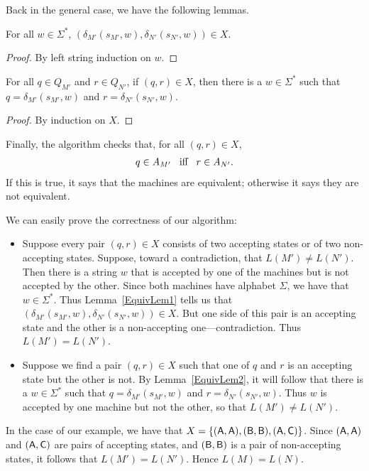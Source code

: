 Back in the general case, we have the following lemmas.

\begin{lemma}
\label{EquivLem1}
For all $w\in\Sigma^*$, $(\delta_{M'}(s_{M'},w),\delta_{N'}(s_{N'},w))\in X$.
\end{lemma}

\begin{proof}
By left string induction on $w$.
\end{proof}

\begin{lemma}
\label{EquivLem2}
For all $q\in Q_{M'}$ and $r\in Q_{N'}$, if $(q,r)\in X$, then there
is a $w\in\Sigma^*$ such that $q=\delta_{M'}(s_{M'},w)$ and
$r=\delta_{N'}(s_{N'},w)$.
\end{lemma}

\begin{proof}
By induction on $X$.
\end{proof}

Finally, the algorithm checks that, for all $(q,r)\in X$,
\begin{gather*}
q\in A_{M'}\mathrel{\;\;\allowbreak\mbox{iff}\allowbreak\;\;} r\in A_{N'} .
\end{gather*}
If this is true, it says that the machines are equivalent; otherwise
it says they are not equivalent.

We can easily prove the correctness of our algorithm:
\begin{itemize}
\item Suppose every pair $(q,r)\in X$ consists of two accepting states
  or of two non-accepting states.  Suppose, toward a contradiction,
  that $L(M')\neq L(N')$.  Then there is a string $w$ that is accepted
  by one of the machines but is not accepted by the other.  Since both
  machines have alphabet $\Sigma$, we have that $w\in\Sigma^*$.  Thus
  Lemma~\ref{EquivLem1} tells us that
  $(\delta_{M'}(s_{M'},w),\delta_{N'}(s_{N'},w))\in X$.  But one side
  of this pair is an accepting state and the other is a non-accepting
  one---contradiction.  Thus $L(M')=L(N')$.

\item Suppose we find a pair $(q,r)\in X$ such that one of $q$ and $r$
  is an accepting state but the other is not.  By
  Lemma~\ref{EquivLem2}, it will follow that there is a $w\in\Sigma^*$
  such that $q=\delta_{M'}(s_{M'},w)$ and $r=\delta_{N'}(s_{N'},w)$.
  Thus $w$ is accepted by one machine but not the other, so that
  $L(M')\neq L(N')$.
\end{itemize}

In the case of our example, we have that
$X=\{(\mathsf{A},\mathsf{A}), (\mathsf{B},\mathsf{B}), (\mathsf{A},\mathsf{C})\}$.
Since $(\mathsf{A},\mathsf{A})$ and $(\mathsf{A},\mathsf{C})$ are pairs of accepting states,
and $(\mathsf{B},\mathsf{B})$ is a pair of non-accepting states, it follows
that $L(M')=L(N')$.  Hence $L(M)=L(N)$.

